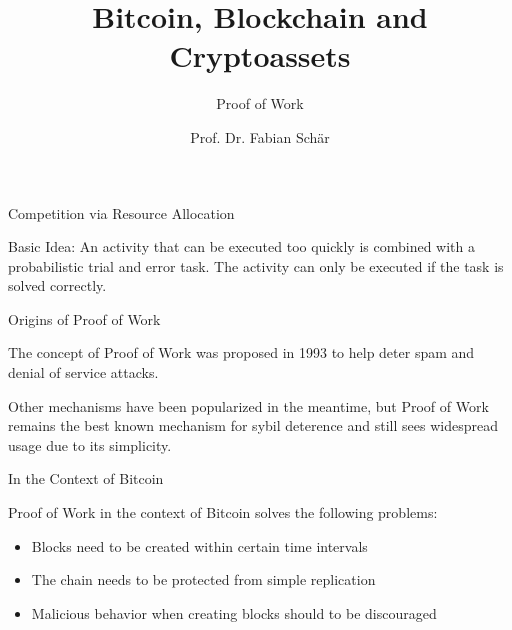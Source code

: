 \documentclass[]{beamer}
\title{Bitcoin, Blockchain and Cryptoassets}
\subtitle{Proof of Work}
\author{Prof. Dr. Fabian Schär}
\institute{University of Basel}
\begin{document}
\thispagestyle{empty}
\begin{frame}[noframenumbering]
	\titlepage
\end{frame}

\begin{frame}{Competition via Resource Allocation}

Basic Idea: An activity that can be executed too quickly is \color{focus}combined with a probabilistic trial and error task\color{black}. The activity can only be executed if the task is solved correctly.

\end{frame}

\begin{frame}{Origins of Proof of Work}
	
	The concept of Proof of Work was proposed in 1993 \cite{dwork_pricing_1993} to help deter spam and denial of service attacks. 
	
	\vspace{1.5em}
	
	Other mechanisms have been popularized in the meantime, but Proof of Work remains the best known mechanism for sybil deterence and still sees widespread usage due to its simplicity.

\end{frame}

\begin{frame}{In the Context of Bitcoin}

Proof of Work in the context of Bitcoin solves the following problems:

\begin{itemize}
	\item Blocks need to be created within certain time intervals
	\item The chain needs to be protected from simple replication
	\item Malicious behavior when creating blocks should to be discouraged 
\end{itemize}

\end{frame}
\end{document}
